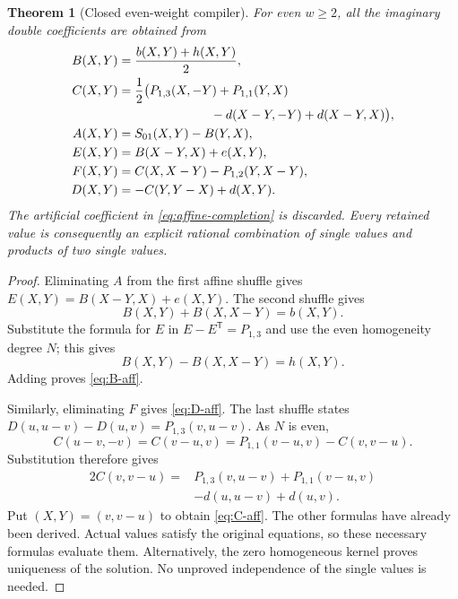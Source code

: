 \documentclass[11pt,a4paper]{article}
\numberwithin{equation}{section}
\newtheorem{theorem}{Theorem}[section]
\theoremstyle{definition}\newtheorem{definition}[theorem]{Definition}
\theoremstyle{remark}\newtheorem{remark}[theorem]{Remark}
\newcommand{\rev}{\mathsf T}
\begin{document}
\begin{theorem}[Closed even-weight compiler]\label{thm:compiler}
For even $w\ge2$, all the imaginary double coefficients are obtained from
\begin{align}
B(X,Y)&=\frac{b(X,Y)+h(X,Y)}2,\label{eq:B-aff}\\
C(X,Y)&=\frac12\bigl(P_{1,3}(X,-Y)+P_{1,1}(Y,X)\notag\\
&\hspace{26mm}-d(X-Y,-Y)+d(X-Y,X)\bigr),\label{eq:C-aff}\\
A(X,Y)&=S_{01}(X,Y)-B(Y,X),\label{eq:A-aff}\\
E(X,Y)&=B(X-Y,X)+e(X,Y),\label{eq:E-aff}\\
F(X,Y)&=C(X,X-Y)-P_{1,2}(Y,X-Y),\label{eq:F-aff}\\
D(X,Y)&=-C(Y,Y-X)+d(X,Y).\label{eq:D-aff}
\end{align}
The artificial coefficient in \eqref{eq:affine-completion} is discarded.
Every retained value is consequently an explicit rational combination of
single values and products of two single values.
\end{theorem}
\begin{proof}
Eliminating $A$ from the first affine shuffle gives
$E(X,Y)=B(X-Y,X)+e(X,Y)$. The second shuffle gives
\[
B(X,Y)+B(X,X-Y)=b(X,Y).
\]
Substitute the formula for $E$ in $E-E^\rev=P_{1,3}$ and use the even
homogeneity degree $N$; this gives
\[
B(X,Y)-B(X,X-Y)=h(X,Y).
\]
Adding proves \eqref{eq:B-aff}.

Similarly, eliminating $F$ gives \eqref{eq:D-aff}. The last shuffle states
$D(u,u-v)-D(u,v)=P_{1,3}(v,u-v)$. As $N$ is even,
\[
C(u-v,-v)=C(v-u,v)=P_{1,1}(v-u,v)-C(v,v-u).
\]
Substitution therefore gives
\begin{align*}
2C(v,v-u)= {}&P_{1,3}(v,u-v)+P_{1,1}(v-u,v)\\
&-d(u,u-v)+d(u,v).
\end{align*}
Put $(X,Y)=(v,v-u)$ to obtain \eqref{eq:C-aff}. The other formulas have
already been derived. Actual values satisfy the original equations, so
these necessary formulas evaluate them. Alternatively, the zero homogeneous
kernel proves uniqueness of the solution. No unproved independence of the
single values is needed.
\end{proof}
\end{document}
